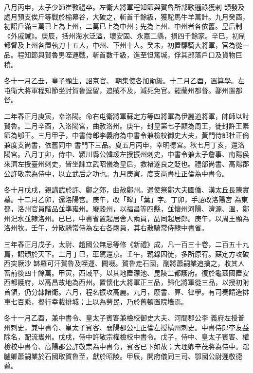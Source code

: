 \begin{pinyinscope}
 八月丙申，太子少師崔敦禮卒。左衛大將軍程知節與賀魯所部歌邏祿獲剌
 頡發及處月預支俟斤等戰於榆幕谷，大破之，斬首千餘級，獲駝馬牛羊萬計。九月癸酉，初詔戶滿三萬已上為上州，二萬已上為中州；先為上州、中州者各依舊。皇后制《外戚誡》。庚辰，括州海水泛溢，壞安固、永嘉二縣，損四千餘家。辛巳，初制都督及上州各置執刀十五人，中州、下州十人。癸未，初置驃騎大將軍，官為從一品。程知節與賀魯男咥運戰，斬首數千級，進至怛篤城，俘其部落戶口及貨物巨積。



 冬十一月乙丑，皇子顯生，詔京官、
 朝集使各加勛級。十二月乙酉，置算學。左屯衛大將軍程知節坐討賀魯逗留，追賊不及，減死免官。罷蘭州都督。鄯州置都督。



 二年春正月庚寅，幸洛陽。命右屯衛將軍蘇定方等四將軍為伊麗道將軍，帥師以討賀魯。二月辛酉，入洛陽宮，曲赦洛州。庚午，封皇第七子顯為周王，徙封許王素節為郇王。三月甲子，中書侍郎李義府為中書令兼檢校御史大夫，黃門侍郎杜正倫兼度支尚書，依舊同中
 書門下三品。夏五月丙申，幸明德宮。秋七月丁亥，還洛陽宮。八月丁卯，侍中、潁川縣公韓瑗左授振州刺史，中書令兼太子詹事、南陽侯來濟左授臺州刺史，皆坐諫立武昭儀為皇后，救褚遂良之貶也。禮部尚書、高陽郡公許敬宗為侍中，以立武后之功也。九月庚寅，度支尚書杜正倫為中書令。



 冬十月戊戌，親講武於許、鄭之郊，曲赦鄭州。遣使祭鄭大夫國僑、漢太丘長陳實墓。十二月乙卯，還洛陽宮。庚午，改「皞」「葉」字。丁卯，手詔改洛陽宮
 為東都，洛州官員階品並準雍州。廢穀州，以福昌等四縣，並懷州河陽、濟源、溫，鄭州汜水並隸洛州。已巳，中書省置起居舍人兩員，品同起居郎。庚午，以周王顯為洛州牧。壬午，分散騎常侍為左右各兩員，其右散騎常侍隸中書省。



 三年春正月戊子，太尉、趙國公無忌等修《新禮》成，凡一百三十卷，二百五十九篇，詔頒於天下。二月丁巳，車駕還京。壬午，親錄囚徒，多所原宥。蘇定方攻破西突厥沙
 缽羅可汗賀魯及咥運、闕啜。賀魯走石國，副將蕭嗣業追擒之，收其人畜前後四十餘萬。甲寅，西域平，以其地置濛池、昆陵二都護府。復於龜茲國置安西都護府，以高昌故地為西州。置懷化大將軍正三品，歸化將軍從三品，以授初附首領，仍分隸諸衛。六月，程名振攻高麗。九月，廢書、算、律學。有司奏請造排車七百乘，擬行幸載排城；上以為勞民，乃於舊頓置院墻焉。



 冬十一月乙酉，兼中書令、皇太子賓客兼檢校御史大夫、河間郡公李
 義府左授普州刺史，兼中書令、皇太子賓客、襄陽郡公杜正倫左授橫州刺史。中書侍郎李友益除名，配流巂州。戊戌，侍中許敬宗權檢校中書令。戊子，侍中、皇太子賓客、權檢校中書令、高陽郡公許敬宗為中書令，賓客已下如故；大理卿辛茂將為侍中。鴻臚卿蕭嗣業於石國取賀魯至，獻於昭陵。甲辰，開府儀同三司、鄂國公尉遲敬德薨。




\end{pinyinscope}
